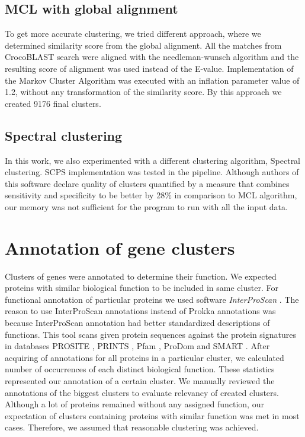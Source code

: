\subsection{MCL with global alignment}
To get more accurate clustering, we tried different approach, where we determined similarity score from the global alignment.
All the matches from CrocoBLAST search were aligned with the needleman-wunsch algorithm \cite{needleman-wunsch} and the resulting score of alignment was used instead of the E-value.
Implementation of the Markov Cluster Algorithm was executed with an inflation parameter value of 1.2, without any transformation of the similarity score.
By this approach we created 9176 final clusters.

\subsection{Spectral clustering}
In this work, we also experimented with a different clustering algorithm, Spectral clustering.
SCPS implementation\cite{scps} was tested in the pipeline.
Although authors of this software declare quality of clusters quantified by a measure that combines sensitivity and specificity to be better by 28\% in comparison to MCL algorithm, our memory was not sufficient for the program to run with all the input data.

\section{Annotation of gene clusters}
Clusters of genes were annotated to determine their function.
We expected proteins with similar biological function to be included in same cluster.
For functional annotation of particular proteins we used software \emph{InterProScan} \cite{interpro}.
The reason to use InterProScan annotations instead of Prokka annotations was because InterProScan annotation had better standardized descriptions of functions.
This tool scans given protein sequences against the protein signatures in databases PROSITE \cite{prosite}, PRINTS \cite{prints}, Pfam \cite{pfam}, ProDom \cite{prodom} and SMART \cite{smart}.
After acquiring of annotations for all proteins in a particular cluster, we calculated number of occurrences of each distinct biological function.
These statistics represented our annotation of a certain cluster.
We manually reviewed the annotations of the biggest clusters to evaluate relevancy of created clusters.
Although a lot of proteins remained without any assigned function, our expectation of clusters containing proteins with similar function was met in most cases.
Therefore, we assumed that reasonable clustering was achieved.

